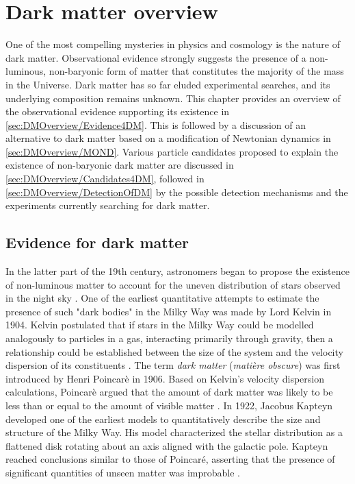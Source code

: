 \chapter{Dark matter overview}\label{chap:DarkMatterOverview}
One of the most compelling mysteries in physics and cosmology is the nature of dark matter. Observational evidence strongly suggests the presence of a non-luminous, non-baryonic form of matter that constitutes the majority of the mass in the Universe. Dark matter has so far eluded experimental searches, and its underlying composition remains unknown. This chapter provides an overview of the observational evidence supporting its existence in \autoref{sec:DMOverview/Evidence4DM}. This is followed by a discussion of an alternative to dark matter based on a modification of Newtonian dynamics in \autoref{sec:DMOverview/MOND}. Various particle candidates proposed to explain the existence of non-baryonic dark matter are discussed in \autoref{sec:DMOverview/Candidates4DM}, followed in \autoref{sec:DMOverview/DetectionOfDM} by the possible detection mechanisms and the experiments currently searching for dark matter.

\section{Evidence for dark matter}\label{sec:DMOverview/Evidence4DM}
In the latter part of the 19th century, astronomers began to propose the existence of non-luminous matter to account for the uneven distribution of stars observed in the night sky \cite{HistoryofDM}. One of the earliest quantitative attempts to estimate the presence of such "dark bodies" in the Milky Way was made by Lord Kelvin in 1904. Kelvin postulated that if stars in the Milky Way could be modelled analogously to particles in a gas, interacting primarily through gravity, then a relationship could be established between the size of the system and the velocity dispersion of its constituents \cite{Kelvin1904}. The term \textit{dark matter} (\textit{mati\`ere obscure}) was first introduced by Henri Poincar\`e in 1906. Based on Kelvin’s velocity dispersion calculations, Poincar\`e argued that the amount of dark matter was likely to be less than or equal to the amount of visible matter \cite{HPon}. In 1922, Jacobus Kapteyn developed one of the earliest models to quantitatively describe the size and structure of the Milky Way. His model characterized the stellar distribution as a flattened disk rotating about an axis aligned with the galactic pole. Kapteyn reached conclusions similar to those of Poincaré, asserting that the presence of significant quantities of unseen matter was improbable \cite{Kapteyn1922}.

